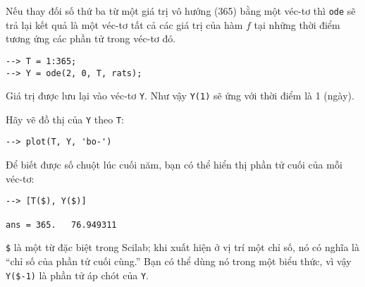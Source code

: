 \documentclass[12pt]{book}
\begin{document}
Nếu thay đối số thứ ba từ một giá trị vô hướng (365) bằng một véc-tơ
thì \texttt{ode} sẽ trả lại kết quả là một véc-tơ tất cả các giá trị của 
hàm $f$ tại những thời điểm tương ứng các phần tử trong véc-tơ đó.
\begin{verbatim}
--> T = 1:365;
--> Y = ode(2, 0, T, rats);
\end{verbatim}

Giá trị được lưu lại vào véc-tơ \texttt{Y}. Như vậy \texttt{Y(1)} sẽ ứng
với thời điểm là 1 (ngày). 

Hãy vẽ đồ thị của \texttt{Y} theo \texttt{T}:
\begin{verbatim}
--> plot(T, Y, 'bo-')
\end{verbatim}




%
%
%
%

Để biết được số chuột lúc cuối năm, bạn có thể hiển thị phần tử cuối
của mỗi véc-tơ:

\begin{verbatim}
--> [T($), Y($)]

ans = 365.   76.949311
\end{verbatim}


{\tt \$} là một từ đặc biệt trong Scilab; khi xuất hiện ở vị trí
một chỉ số, nó có nghĩa là ``chỉ số của phần tử cuối cùng.''  Bạn
có thể dùng nó trong một biểu thức, vì vậy {\tt Y(\$-1)} là 
phần tử áp chót của {\tt Y}.
\end{document}
